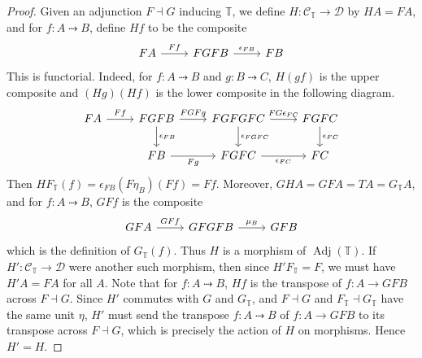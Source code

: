 \begin{proof}
    Given an adjunction \( F \dashv G \) inducing \( \mathbb T \), we define \( H : \mathcal C_{\mathbb T} \to \mathcal D \) by \( HA = FA \), and for \( f : A \rightdotarrow B \), define \( Hf \) to be the composite
\[\begin{tikzcd}
	FA & FGFB & FB
	\arrow["Ff", from=1-1, to=1-2]
	\arrow["{\epsilon_{FB}}", from=1-2, to=1-3]
\end{tikzcd}\]
This is functorial.
Indeed, for \( f : A \rightdotarrow B \) and \( g : B \rightdotarrow C \), \( H(gf) \) is the upper composite and \( (Hg)(Hf) \) is the lower composite in the following diagram.
\[\begin{tikzcd}
	FA & FGFB & FGFGFC & FGFC \\
	& FB & FGFC & FC
	\arrow["Ff", from=1-1, to=1-2]
	\arrow["FGFg", from=1-2, to=1-3]
	\arrow["{FG\epsilon_{FC}}", from=1-3, to=1-4]
	\arrow["{\epsilon_{FC}}", from=1-4, to=2-4]
	\arrow["{\epsilon_{FGFC}}", from=1-3, to=2-3]
	\arrow["{\epsilon_{FC}}"', from=2-3, to=2-4]
	\arrow["{\epsilon_{FB}}", from=1-2, to=2-2]
	\arrow["Fg"', from=2-2, to=2-3]
\end{tikzcd}\]
    Then \( HF_{\mathbb T}(f) = \epsilon_{FB} (F\eta_B) (Ff) = Ff \).
    Moreover, \( GHA = GFA = TA = G_{\mathbb T} A \), and for \( f : A \rightdotarrow B \), \( GFf \) is the composite
\[\begin{tikzcd}
	GFA & GFGFB & GFB
	\arrow["GFf", from=1-1, to=1-2]
	\arrow["{\mu_B}", from=1-2, to=1-3]
\end{tikzcd}\]
    which is the definition of \( G_{\mathbb T}(f) \).
    Thus \( H \) is a morphism of \( \operatorname{Adj}(\mathbb T) \).
    If \( H' : \mathcal C_{\mathbb T} \to \mathcal D \) were another such morphism, then since \( H' F_{\mathbb T} = F \), we must have \( H' A = FA \) for all \( A \).
    Note that for \( f : A \rightdotarrow B \), \( Hf \) is the transpose of \( f : A \to GFB \) across \( F \dashv G \).
    Since \( H' \) commutes with \( G \) and \( G_{\mathbb T} \), and \( F \dashv G \) and \( F_{\mathbb T} \dashv G_{\mathbb T} \) have the same unit \( \eta \), \( H' \) must send the transpose \( f : A \rightdotarrow B \) of \( f : A \to GFB \) to its transpose across \( F \dashv G \), which is precisely the action of \( H \) on morphisms.
    Hence \( H' = H \).
\end{proof}
